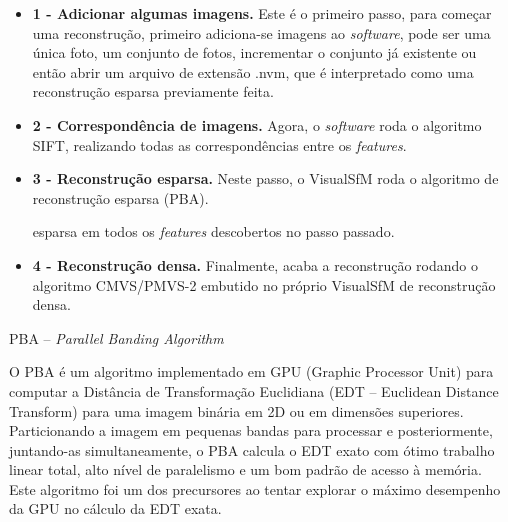 \begin{itemize}
\item \textbf{1 - Adicionar algumas imagens.} Este é o primeiro passo, para começar uma reconstrução, primeiro adiciona-se imagens ao {\it software}, pode ser uma única foto, um conjunto de fotos, incrementar o conjunto já existente ou então abrir um arquivo de extensão .nvm, que é interpretado como uma reconstrução esparsa previamente feita.

\item \textbf{2 - Correspondência de imagens.} Agora, o {\it software} roda o algoritmo SIFT, realizando todas as correspondências entre os {\it features}.

\item \textbf{3 - Reconstrução esparsa.} Neste passo, o VisualSfM roda o algoritmo de reconstrução esparsa (PBA). %

esparsa em todos os {\it features} descobertos no passo passado.

\item \textbf{4 - Reconstrução densa.} Finalmente, acaba a reconstrução rodando o algoritmo CMVS/PMVS-2 embutido no próprio VisualSfM de reconstrução densa.
\end{itemize}

PBA -- {\it Parallel Banding Algorithm}

O PBA é um algoritmo implementado em GPU (Graphic Processor Unit) para computar a Distância de Transformação Euclidiana (EDT -- Euclidean Distance Transform) para uma imagem binária em 2D ou em dimensões superiores. Particionando a imagem em pequenas bandas para processar e posteriormente, juntando-as simultaneamente, o PBA calcula o EDT exato com ótimo trabalho linear total, alto nível de paralelismo e um bom padrão de acesso à memória. Este algoritmo foi um dos precursores ao tentar explorar o máximo desempenho da GPU no cálculo da EDT exata. 





